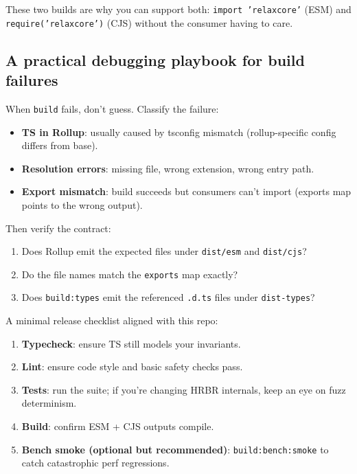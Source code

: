These two builds are why you can support both:
	\texttt{import 'relaxcore'} (ESM) and \texttt{require('relaxcore')} (CJS) without the consumer having to care.

\subsection{A practical debugging playbook for build failures}

When \texttt{build} fails, don't guess.
Classify the failure:

\begin{itemize}
\item \textbf{TS in Rollup}: usually caused by tsconfig mismatch (rollup-specific config differs from base).
\item \textbf{Resolution errors}: missing file, wrong extension, wrong entry path.
\item \textbf{Export mismatch}: build succeeds but consumers can't import (exports map points to the wrong output).
\end{itemize}

Then verify the contract:

\begin{enumerate}
\item Does Rollup emit the expected files under \texttt{dist/esm} and \texttt{dist/cjs}?
\item Do the file names match the \texttt{exports} map exactly?
\item Does \texttt{build:types} emit the referenced \texttt{.d.ts} files under \texttt{dist-types}?
\end{enumerate}

A minimal release checklist aligned with this repo:

\begin{enumerate}
\item \textbf{Typecheck}: ensure TS still models your invariants.
\item \textbf{Lint}: ensure code style and basic safety checks pass.
\item \textbf{Tests}: run the suite; if you're changing HRBR internals, keep an eye on fuzz determinism.
\item \textbf{Build}: confirm ESM + CJS outputs compile.
\item \textbf{Bench smoke (optional but recommended)}: \texttt{build:bench:smoke} to catch catastrophic perf regressions.
\end{enumerate}

